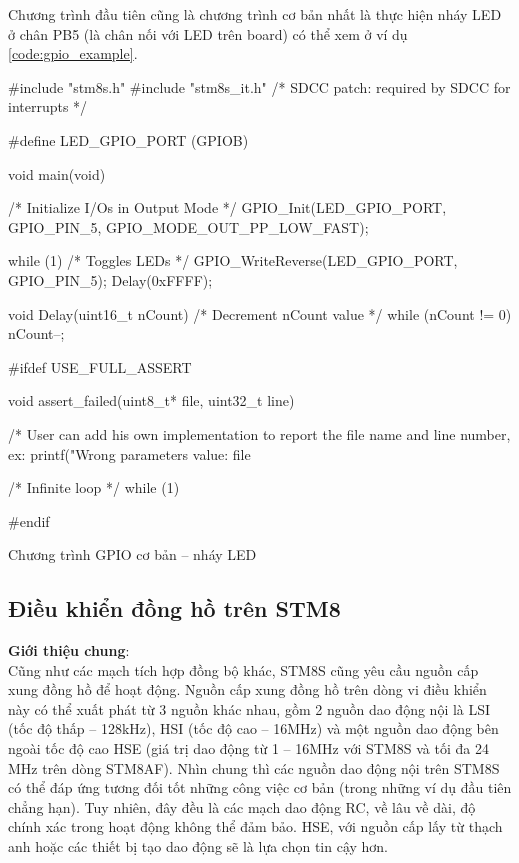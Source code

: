 Chương trình đầu tiên cũng là chương trình cơ bản nhất là thực hiện nháy LED ở chân PB5 (là chân nối với LED trên board) có thể xem ở ví dụ \ref{code:gpio_example}.
\begin{listing}[!ht]
\begin{ccode}
#include "stm8s.h"
#include "stm8s_it.h"    /* SDCC patch: required by SDCC for interrupts */

#define LED_GPIO_PORT  (GPIOB)

void main(void)
{

  /* Initialize I/Os in Output Mode */
  GPIO_Init(LED_GPIO_PORT, GPIO_PIN_5, GPIO_MODE_OUT_PP_LOW_FAST);

  while (1)
  {
    /* Toggles LEDs */
    GPIO_WriteReverse(LED_GPIO_PORT, GPIO_PIN_5);
    Delay(0xFFFF);
  }
}

void Delay(uint16_t nCount)
{
  /* Decrement nCount value */
  while (nCount != 0)
  {
    nCount--;
  }
}

#ifdef USE_FULL_ASSERT

void assert_failed(uint8_t* file, uint32_t line)
{
  /* User can add his own implementation to report the file name and line number,
     ex: printf("Wrong parameters value: file %

  /* Infinite loop */
  while (1)
  {
  }
}
#endif
\end{ccode}
\caption{Chương trình GPIO cơ bản -- nháy LED}
\label{code:gpio_example}
\end{listing}

\pagebreak
\subsection{Điều khiển đồng hồ trên STM8}
\textbf{Giới thiệu chung}:\\
Cũng như các mạch tích hợp đồng bộ khác, STM8S cũng yêu cầu nguồn cấp xung đồng hồ để hoạt động.
Nguồn cấp xung đồng hồ trên dòng vi điều khiển này có thể xuất phát từ 3 nguồn khác nhau, gồm 2 nguồn dao động nội là LSI (tốc độ thấp -- 128kHz), HSI (tốc độ cao -- 16MHz) và một nguồn dao động bên ngoài tốc độ cao HSE (giá trị dao động từ 1 – 16MHz với STM8S và tối đa 24 MHz trên dòng STM8AF).
Nhìn chung thì các nguồn dao động nội trên STM8S có thể đáp ứng tương đối tốt những công việc cơ bản (trong những ví dụ đầu tiên chẳng hạn).
Tuy nhiên, đây đều là các mạch dao động RC, về lâu về dài, độ chính xác trong hoạt động không thể đảm bảo.
HSE, với nguồn cấp lấy từ thạch anh hoặc các thiết bị tạo dao động sẽ là lựa chọn tin cậy hơn.

